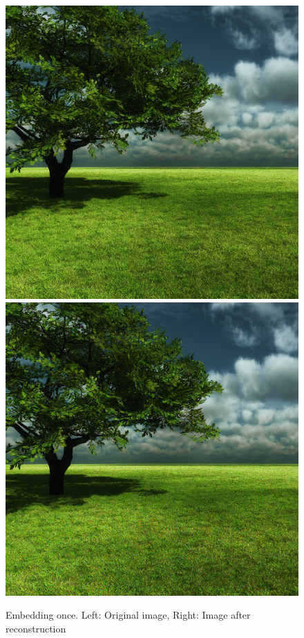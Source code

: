 \documentclass[12pt]{article}
\begin{document}
\begin{figure}[h]
\centerline{%
\includegraphics[scale=0.3375]{"tree"}%
\hspace{0.1cm}
\includegraphics[scale=0.45]{"Tree Embed once 0.8 threshold/finalImageAfterRestoration"}%
}%
\caption{Embedding once. Left: Original image, Right: Image after reconstruction}
\label{fig:treeEmbedOnceRestore}
\end{figure}
\end{document}
